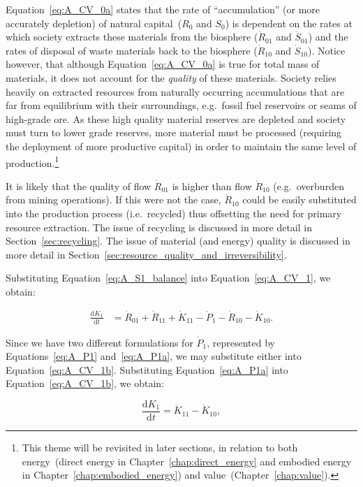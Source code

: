 Equation~\ref{eq:A_CV_0a} states that the rate of ``accumulation'' 
(or more accurately depletion) 
of natural capital~($R_{0}$ and $S_{0}$) 
is dependent on the rates at which society extracts these materials
from the biosphere ($\dot{R}_{01}$ and $\dot{S}_{01}$) and the rates
of disposal of waste materials back to the biosphere ($\dot{R}_{10}$ 
and $\dot{S}_{10}$).
Notice however, 
that although Equation~\ref{eq:A_CV_0a} 
is true for total mass of materials,
it does not account for the \emph{quality} of these materials.
Society relies heavily on extracted resources 
from naturally occurring accumulations that are 
far from equilibrium with their surroundings,
e.g.\ fossil fuel reservoirs or seams of high-grade ore. 
As these high quality material reserves are depleted 
and society must turn to lower grade reserves, 
more material must be processed 
(requiring the deployment of more productive capital)
in order to maintain the same level of 
production.\footnote{This theme 
	will be revisited in later sections,
	in relation to both energy~(direct energy in Chapter~\ref{chap:direct_energy}
	and embodied energy in Chapter~\ref{chap:embodied_energy}) and 
	value~(Chapter~\ref{chap:value}).
	}\cite{Mudd2010}

It is likely that the quality
of flow $\dot{R}_{01}$ is higher than flow $\dot{R}_{10}$ 
(e.g.\ overburden from mining operations). 
If this were not the case,
$\dot{R}_{10}$ could be easily substituted 
into the production process (i.e.\ recycled) thus
offsetting the need for primary resource extraction. 
The issue of recycling is discussed in more detail in 
Section~\ref{sec:recycling}.
The issue of material (and energy) quality 
is discussed in more detail in 
Section~\ref{sec:resource_quality_and_irreversibility}.

Substituting Equation~\ref{eq:A_S1_balance} 
into Equation~\ref{eq:A_CV_1}, we obtain:

\begin{align}\label{eq:A_CV_1b}
	\frac{\mathrm{d}K_{1}}{\mathrm{d}t}		&
	= \dot{R}_{01} 
	+ \dot{R}_{11}
	+ \dot{K}_{11}
	- \dot{P}_{1}				
	- \dot{R}_{10}				
	- \dot{K}_{10}.
\end{align}

Since we have two different formulations for $\dot{P}_{1}$,
represented by Equations~\ref{eq:A_P1} and~\ref{eq:A_P1a}, 
we may substitute either into Equation~\ref{eq:A_CV_1b}.
Substituting Equation~\ref{eq:A_P1a} 
into Equation~\ref{eq:A_CV_1b}, we obtain:

\begin{equation}\label{eq:A_CV_1c}
	\frac{\mathrm{d}K_{1}}{\mathrm{d}t}		
	= \dot{K}_{11}
	- \dot{K}_{10},
\end{equation}


